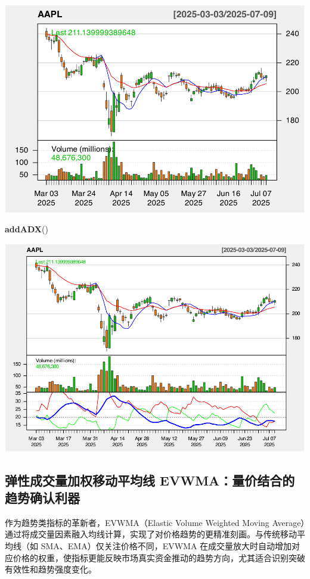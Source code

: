 \documentclass[]{ctexbook}
\newenvironment{Shaded}{\begin{snugshade}}{\end{snugshade}}
\newcommand{\FunctionTok}[1]{\textcolor[rgb]{0.13,0.29,0.53}{\textbf{#1}}}
\newcommand{\NormalTok}[1]{#1}
\begin{document}
\includegraphics[width=0.9\linewidth]{quantmod_files/figure-latex/zlema_2-3}

\begin{Shaded}
\begin{Highlighting}[]
\FunctionTok{addADX}\NormalTok{()}
\end{Highlighting}
\end{Shaded}

\includegraphics[width=0.9\linewidth]{quantmod_files/figure-latex/zlema_2-4}

\subsection{弹性成交量加权移动平均线 EVWMA：量价结合的趋势确认利器}\label{ux5f39ux6027ux6210ux4ea4ux91cfux52a0ux6743ux79fbux52a8ux5e73ux5747ux7ebf-evwmaux91cfux4ef7ux7ed3ux5408ux7684ux8d8bux52bfux786eux8ba4ux5229ux5668}

作为趋势类指标的革新者，EVWMA（Elastic Volume Weighted Moving Average）通过将成交量因素融入均线计算，实现了对价格趋势的更精准刻画。与传统移动平均线（如 SMA、EMA）仅关注价格不同，EVWMA 在成交量放大时自动增加对应价格的权重，使指标更能反映市场真实资金推动的趋势方向，尤其适合识别突破有效性和趋势强度变化。
\end{document}
